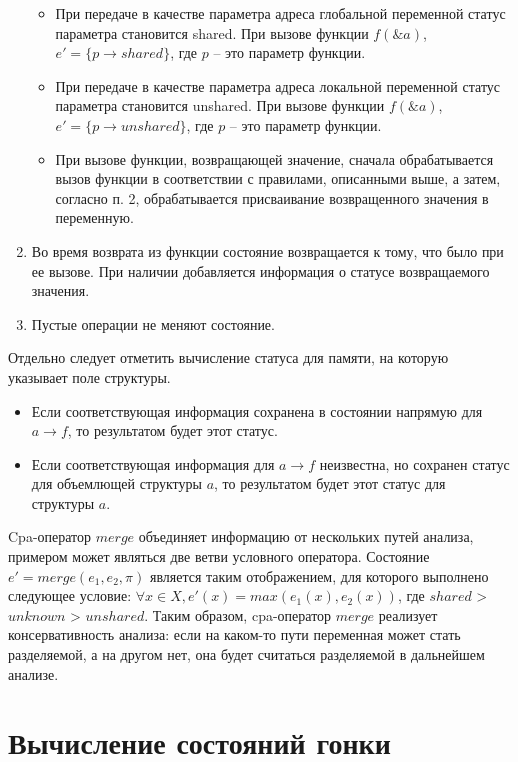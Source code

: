 \begin{enumerate}
\begin{itemize}
\item При передаче в качестве параметра адреса глобальной переменной статус параметра становится shared.
При вызове функции $f(\&a)$, $e' = \{p \to shared\}$, где $p$ -- это параметр функции.

\item При передаче в качестве параметра адреса локальной переменной статус параметра становится unshared.
При вызове функции $f(\&a)$, $e' = \{p \to unshared\}$, где $p$ -- это параметр функции.

\item При вызове функции, возвращающей значение, сначала обрабатывается вызов функции в соответствии с правилами, описанными выше, а затем, согласно п. 2, обрабатывается присваивание возвращенного значения в переменную.

\end{itemize}

\item Во время возврата из функции состояние возвращается к тому, что было при ее вызове. 
При наличии добавляется информация о статусе возвращаемого значения.

\item Пустые операции не меняют состояние.
\end{enumerate}

Отдельно следует отметить вычисление статуса для памяти, на которую указывает поле структуры.
\begin{itemize}
\item Если соответствующая информация сохранена в состоянии напрямую для $a \rightarrow f$, то результатом будет этот статус.
\item Если соответствующая информация для $a \rightarrow f$ неизвестна, но сохранен статус для объемлющей структуры $a$, то результатом будет этот статус для структуры $a$.
\end{itemize}

Cpa-оператор $merge$ объединяет информацию от нескольких путей анализа, примером может являться две ветви условного оператора.
Состояние $e' = merge(e_1, e_2, \pi)$ является таким отображением, для которого выполнено следующее условие: $\forall x \in X, e'(x) = max(e_1(x), e_2(x))$, где $shared$ > $unknown$ > $unshared$.
Таким образом, cpa-оператор $merge$ реализует консервативность анализа: если на каком-то пути переменная может стать разделяемой, а на другом нет, она будет считаться разделяемой в дальнейшем анализе.

\section{Вычисление состояний гонки}
\label{sect_impl_races}

